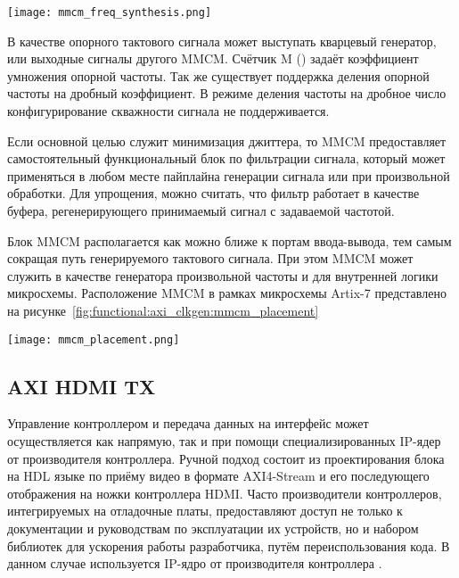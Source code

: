 \begin{center}
  \centering
  \texttt{[image: mmcm\_freq\_synthesis.png]}
  \label{fig:functional:axi_clkgen:mmcm_freq_synthesis}
\end{center}

В качестве опорного тактового сигнала может выступать кварцевый генератор, или выходные
сигналы другого MMCM. Счётчик M () задаёт коэффициент умножения опорной частоты.
Так же существует поддержка деления опорной частоты на дробный коэффициент. В режиме
деления частоты на дробное число конфигурирование скважности сигнала не поддерживается.

Если основной целью служит минимизация джиттера, то MMCM предоставляет самостоятельный
функциональный блок по фильтрации сигнала, который может применяться в любом месте
пайплайна генерации сигнала или при произвольной обработки. Для упрощения, можно считать, что
фильтр работает в качестве буфера, регенерирующего принимаемый сигнал с задаваемой частотой.

Блок  MMCM располагается как можно ближе к портам ввода-вывода, тем самым сокращая путь генерируемого тактового сигнала.
При этом MMCM может служить в качестве генератора произвольной частоты и для внутренней логики микросхемы.
Расположение MMCM в рамках микросхемы Artix-7 представлено на рисунке~\ref{fig:functional:axi_clkgen:mmcm_placement}

\begin{center}
  \centering
  \texttt{[image: mmcm\_placement.png]}
  \label{fig:functional:axi_clkgen:mmcm_placement}
\end{center}

\subsection{AXI HDMI TX}
\label{sec:functional:axi_hdmi_tx}

Управление контроллером  и передача данных на интерфейс может осуществляется как напрямую,
так и при помощи специализированных IP-ядер от производителя контроллера. Ручной подход состоит из
проектирования блока на HDL языке по приёму видео в формате AXI4-Stream и его последующего отображения
на ножки контроллера HDMI. Часто производители контроллеров, интегрируемых на отладочные платы, предоставляют
доступ не только к документации и руководствам по эксплуатации их устройств, но и набором библиотек для
ускорения работы разработчика, путём переиспользования кода. В данном случае используется IP-ядро
от производителя контроллера .

